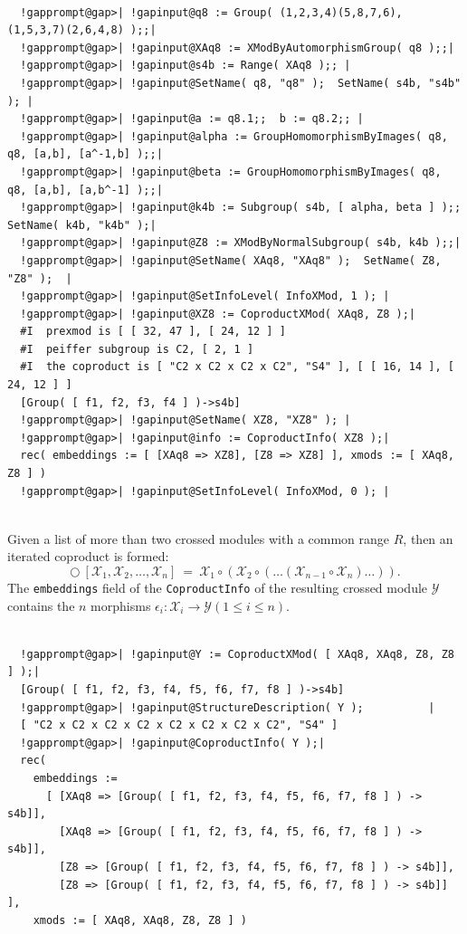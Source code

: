 \documentclass[a4paper,11pt]{report}
\newcommand{\calX}{\mathcal{X}}
\newcommand{\calY}{\mathcal{Y}}
\begin{document}
{{ 

 
\begin{Verbatim}[commandchars=!@|,fontsize=\small,frame=single,label=Example]
  
  !gapprompt@gap>| !gapinput@q8 := Group( (1,2,3,4)(5,8,7,6), (1,5,3,7)(2,6,4,8) );;|
  !gapprompt@gap>| !gapinput@XAq8 := XModByAutomorphismGroup( q8 );;|
  !gapprompt@gap>| !gapinput@s4b := Range( XAq8 );; |
  !gapprompt@gap>| !gapinput@SetName( q8, "q8" );  SetName( s4b, "s4b" ); |
  !gapprompt@gap>| !gapinput@a := q8.1;;  b := q8.2;; |
  !gapprompt@gap>| !gapinput@alpha := GroupHomomorphismByImages( q8, q8, [a,b], [a^-1,b] );;|
  !gapprompt@gap>| !gapinput@beta := GroupHomomorphismByImages( q8, q8, [a,b], [a,b^-1] );;|
  !gapprompt@gap>| !gapinput@k4b := Subgroup( s4b, [ alpha, beta ] );;  SetName( k4b, "k4b" );|
  !gapprompt@gap>| !gapinput@Z8 := XModByNormalSubgroup( s4b, k4b );;|
  !gapprompt@gap>| !gapinput@SetName( XAq8, "XAq8" );  SetName( Z8, "Z8" );  |
  !gapprompt@gap>| !gapinput@SetInfoLevel( InfoXMod, 1 ); |
  !gapprompt@gap>| !gapinput@XZ8 := CoproductXMod( XAq8, Z8 );|
  #I  prexmod is [ [ 32, 47 ], [ 24, 12 ] ]
  #I  peiffer subgroup is C2, [ 2, 1 ]
  #I  the coproduct is [ "C2 x C2 x C2 x C2", "S4" ], [ [ 16, 14 ], [ 24, 12 ] ]
  [Group( [ f1, f2, f3, f4 ] )->s4b]
  !gapprompt@gap>| !gapinput@SetName( XZ8, "XZ8" ); |
  !gapprompt@gap>| !gapinput@info := CoproductInfo( XZ8 );|
  rec( embeddings := [ [XAq8 => XZ8], [Z8 => XZ8] ], xmods := [ XAq8, Z8 ] )
  !gapprompt@gap>| !gapinput@SetInfoLevel( InfoXMod, 0 ); |
  
\end{Verbatim}
 Given a list of more than two crossed modules with a common range $R$, then an iterated coproduct is formed: 
\[ \bigcirc~\left[ \calX_1,\calX_2,\ldots,\calX_n\right] ~=~ \calX_1 \circ
(\calX_2 \circ ( \ldots (\calX_{n-1} \circ \calX_n) \ldots ) ). \]
 The \texttt{embeddings} field of the \texttt{CoproductInfo} of the resulting crossed module $\calY$ contains the $n$ morphisms $\epsilon_i : \calX_i \to \calY (1 \leqslant i \leqslant n)$. 

 
\begin{Verbatim}[commandchars=!@|,fontsize=\small,frame=single,label=Example]
  
  !gapprompt@gap>| !gapinput@Y := CoproductXMod( [ XAq8, XAq8, Z8, Z8 ] );|
  [Group( [ f1, f2, f3, f4, f5, f6, f7, f8 ] )->s4b]
  !gapprompt@gap>| !gapinput@StructureDescription( Y );          |
  [ "C2 x C2 x C2 x C2 x C2 x C2 x C2 x C2", "S4" ]
  !gapprompt@gap>| !gapinput@CoproductInfo( Y );|
  rec( 
    embeddings := 
      [ [XAq8 => [Group( [ f1, f2, f3, f4, f5, f6, f7, f8 ] ) -> s4b]], 
        [XAq8 => [Group( [ f1, f2, f3, f4, f5, f6, f7, f8 ] ) -> s4b]], 
        [Z8 => [Group( [ f1, f2, f3, f4, f5, f6, f7, f8 ] ) -> s4b]], 
        [Z8 => [Group( [ f1, f2, f3, f4, f5, f6, f7, f8 ] ) -> s4b]] ], 
    xmods := [ XAq8, XAq8, Z8, Z8 ] )
  

\end{Verbatim}}}
\end{document}
